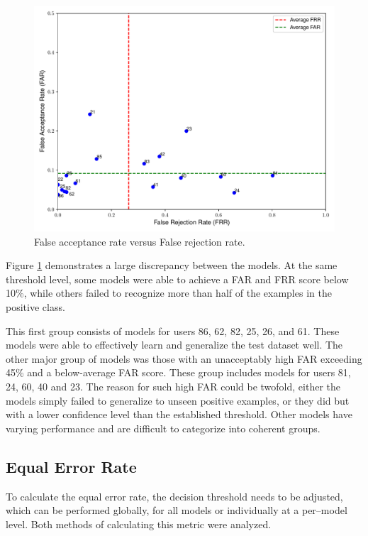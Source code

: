 \begin{figure}[H]
	\centering
	\includegraphics[width=\textwidth]{images/far_vs_frr.pdf} 	
	\caption{False acceptance rate versus False rejection rate.}
	\label{fig:frr_vs_far_all_models_base}
\end{figure}

Figure \ref{fig:frr_vs_far_all_models_base} demonstrates a large discrepancy between the models. At the same threshold level, some models were able to achieve a FAR and FRR score below 10\%, while others failed to recognize more than half of the examples in the positive class.

This first group consists of models for users 86, 62, 82, 25, 26, and 61. These models were able to effectively learn and generalize the test dataset well.
The other major group of models was those with an unacceptably high FAR exceeding 45\% and a below-average FAR score. These group includes models for users 81, 24, 60, 40 and 23. The reason for such high FAR could be twofold, either the models simply failed to generalize to unseen positive examples, or they did but with a lower confidence level than the established threshold. Other models have varying performance and are difficult to categorize into coherent groups.

\subsection{Equal Error Rate} \label{subsec_eer}
To calculate the equal error rate, the decision threshold needs to be adjusted, which can be performed globally, for all models or individually at a per--model level. Both methods of calculating this metric were analyzed.

